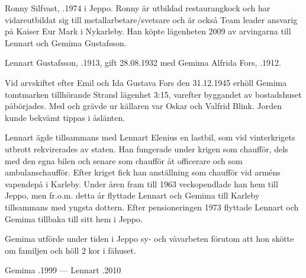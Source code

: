 %



%
Ronny Silfvast, .1974 i Jeppo. Ronny är utbildad restaurangkock och har vidareutbildat sig till metallarbetare/svetsare och är också Team leader ansvarig på Kaiser Eur Mark i Nykarleby. Han köpte lägenheten 2009 av arvingarna till Lennart och Gemima Gustafsson.


%
Lennart Gustafsson, .1913, gift 28.08.1932 med Gemima Alfrida Fors, .1912.
\begin{jhchildren}
  \item {}
  \item {}
  \item {}
  \item {}
  \item {}
\end{jhchildren}
Vid arvskiftet efter Emil och Ida Gustava Fors den 31.12.1945 erhöll Gemima tomtmarken tillhörande Strand lägenhet 3:15, varefter byggandet av bostadshuset påbörjades. Med och grävde ur källaren var Oskar och Valfrid Blink. Jorden kunde bekvämt tippas i åslänten.

Lennart ägde tillsammans med Lennart Elenius en lastbil, som vid vinterkrigets utbrott rekvirerades av staten. Han fungerade under krigen som chaufför, dels med den egna bilen och senare som chaufför åt officerare och som ambulanschaufför. Efter kriget fick han anställning som chaufför vid arméns vapendepå i Karleby. Under åren fram till 1963 veckopendlade han hem till Jeppo, men fr.o.m. detta år flyttade Lennart och Gemima till Karleby tillsammans med yngsta dottern. Efter pensioneringen 1973 flyttade Lennart och Gemima tillbaka till sitt hem i Jeppo.

Gemima utförde under tiden i Jeppo sy- och vävarbeten förutom att hon skötte om familjen och höll 2 kor i fähuset.

Gemima .1999  ---  Lennart .2010



